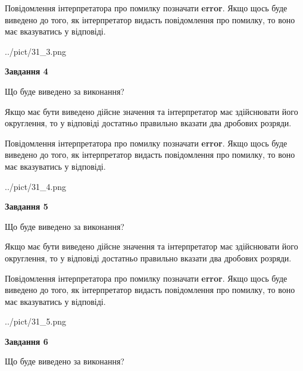 \documentclass[12pt, ukrainian]{article}
\begin{document}
{\begin {Large}
Повідомлення інтерпретатора про помилку позначати \textbf{error}.
Якщо щось буде виведено до того, як інтерпретатор видасть повідомлення про помилку, 
то воно має вказуватись у відповіді. \par

\begin{center}
	{../pict/31_3.png}
\end{center}
\newpage

{\begin {center}\textbf{Завдання 4}\end {center}}\par
Що буде виведено за виконання? \par

Якщо має бути виведено дійсне значення та інтерпретатор має здійснювати його округлення, 
то у відповіді достатньо правильно вказати два дробових розряди.

Повідомлення інтерпретатора про помилку позначати \textbf{error}.
Якщо щось буде виведено до того, як інтерпретатор видасть повідомлення про помилку, 
то воно має вказуватись у відповіді. \par

\begin{center}
	{../pict/31_4.png}
\end{center}
\newpage

{\begin {center}\textbf{Завдання 5}\end {center}}\par
Що буде виведено за виконання? \par

Якщо має бути виведено дійсне значення та інтерпретатор має здійснювати його округлення, 
то у відповіді достатньо правильно вказати два дробових розряди.

Повідомлення інтерпретатора про помилку позначати \textbf{error}.
Якщо щось буде виведено до того, як інтерпретатор видасть повідомлення про помилку, 
то воно має вказуватись у відповіді. \par

\begin{center}
	{../pict/31_5.png}
\end{center}
\newpage

{\begin {center}\textbf{Завдання 6}\end {center}}\par
Що буде виведено за виконання? \par


\end{Large}}
\end{document}

